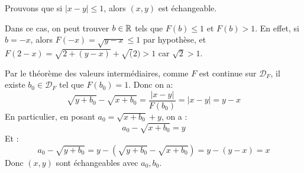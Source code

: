 \documentclass[]{../../homework}
\begin{document}
	\subproblem
	Prouvons que si $|x-y| \leq 1$, alors $(x,y)$ est échangeable.
	
	Dans ce cas, on peut trouver $b\in\mathbb R$ tels que $F(b) \leq 1$ et $F(b) > 1$. En effet, si $b=-x$, alors $F(-x) = \sqrt{y-x} \leq 1$ par hypothèse, et $F(2-x) = \sqrt{2+(y-x)} + \sqrt(2) > 1$ car $\sqrt{2} > 1$.
	
	Par le théorème des valeurs intermédiaires, comme $F$ est continue sur $\mathcal D_F$, il existe $b_0 \in \mathcal D_F$ tel que $F(b_0) = 1$. Donc on a:
	\begin{equation*}
		\sqrt{y+b_0} - \sqrt{x+b_0} = \frac{|x-y|}{F(b_0)} = |x-y| = y-x
	\end{equation*}
	En particulier, en posant $a_0 = \sqrt{x+b_0} + y$, on a : $$a_0 - \sqrt{x+b_0} = y$$
	Et :$$a_0 - \sqrt{y+b_0} = y - (\sqrt{y+b_0} - \sqrt{x+b_0}) = y - (y-x) = x$$
	Donc $(x,y)$ sont échangeables avec $a_0, b_0$.
\end{document}
